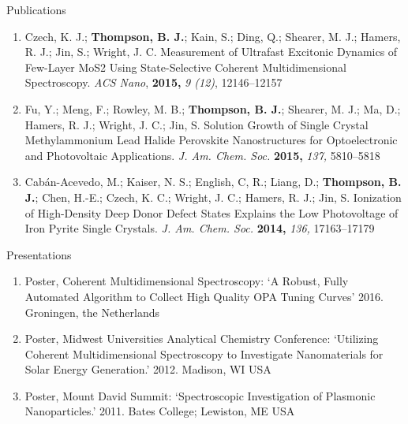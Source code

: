 \documentclass{resume}  %
\begin{document}
\begin{rSection}{Publications}
	
\begin{enumerate}[leftmargin = 0 pt]
\item Czech, K. J.; \textbf{Thompson, B. J.}; Kain, S.; Ding, Q.; Shearer, M. J.; Hamers, R. J.; Jin, S.; Wright, J. C.
Measurement of Ultrafast Excitonic Dynamics of Few-Layer MoS2 Using State-Selective Coherent Multidimensional Spectroscopy.
\textit{ACS Nano}, \textbf{2015,} \textit{9 (12)}, 12146--12157

\item Fu, Y.; Meng, F.; Rowley, M. B.; \textbf{Thompson, B. J.}; Shearer, M. J.; Ma, D.; Hamers, R. J.; Wright, J. C.; Jin, S.
Solution Growth of Single Crystal Methylammonium Lead Halide Perovskite Nanostructures for Optoelectronic and Photovoltaic Applications.
\textit{J. Am. Chem. Soc.} \textbf{2015,} \textit{137,} 5810--5818

\item Cab\'an-Acevedo, M.; Kaiser, N. S.; English, C, R.; Liang, D.; \textbf{Thompson, B. J.}; Chen, H.-E.; Czech, K. C.; Wright, J. C.; Hamers, R. J.; Jin, S. 
Ionization of High-Density Deep Donor Defect States Explains the Low Photovoltage of Iron Pyrite Single Crystals. 
\textit{J. Am. Chem. Soc.} \textbf{2014,} \textit{136,} 17163--17179
\end{enumerate}

\end{rSection}


\begin{rSection}{Presentations}

\begin{enumerate}[leftmargin = 0 pt]
\item Poster, Coherent Multidimensional Spectroscopy: `A Robust, Fully Automated Algorithm to Collect High Quality OPA Tuning Curves' 2016. Groningen, the Netherlands
\item Poster, Midwest Universities Analytical Chemistry Conference:
`Utilizing Coherent Multidimensional Spectroscopy to Investigate Nanomaterials for Solar Energy Generation.'
2012. Madison, WI USA
\item Poster, Mount David Summit:
`Spectroscopic Investigation of Plasmonic Nanoparticles.'
2011. Bates College; Lewiston, ME USA
\end{enumerate}

\end{rSection}
\end{document}
